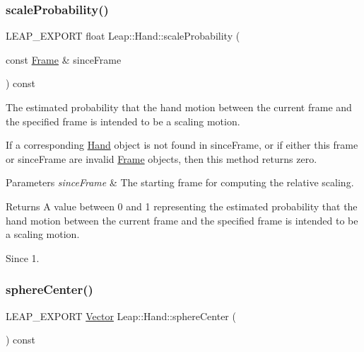 \subsubsection{\texorpdfstring{scale\+Probability()}{scaleProbability()}}
{\footnotesize\ttfamily L\+E\+A\+P\+\_\+\+E\+X\+P\+O\+RT float Leap\+::\+Hand\+::scale\+Probability (\begin{DoxyParamCaption}\item[{const \hyperlink{class_leap_1_1_frame}{Frame} \&}]{since\+Frame }\end{DoxyParamCaption}) const}

The estimated probability that the hand motion between the current frame and the specified frame is intended to be a scaling motion.


\begin{DoxyCodeInclude}
\end{DoxyCodeInclude}


If a corresponding \hyperlink{class_leap_1_1_hand}{Hand} object is not found in since\+Frame, or if either this frame or since\+Frame are invalid \hyperlink{class_leap_1_1_frame}{Frame} objects, then this method returns zero.


\begin{DoxyParams}{Parameters}
{\em since\+Frame} & The starting frame for computing the relative scaling. \\
\hline
\end{DoxyParams}
\begin{DoxyReturn}{Returns}
A value between 0 and 1 representing the estimated probability that the hand motion between the current frame and the specified frame is intended to be a scaling motion. 
\end{DoxyReturn}
\begin{DoxySince}{Since}
1. 
\end{DoxySince}
\mbox{\label{class_leap_1_1_hand_aede162c1102ca6acf796f4735044ce10}} 
\subsubsection{\texorpdfstring{sphere\+Center()}{sphereCenter()}}
{\footnotesize\ttfamily L\+E\+A\+P\+\_\+\+E\+X\+P\+O\+RT \hyperlink{struct_leap_1_1_vector}{Vector} Leap\+::\+Hand\+::sphere\+Center (\begin{DoxyParamCaption}{ }\end{DoxyParamCaption}) const}

